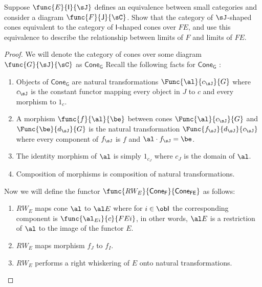 \documentclass[main.tex]{subfiles}
\begin{document}
\begin{exercise}
	Suppose $\func{E}{\mathsf{I}}{\sJ}$ defines an equivalence between
	small categories and consider a diagram $\func{F}{\mathsf{J}}{\sC}$.
	Show that the category of $\sJ$-shaped cones equivalent to the category
	of $\mathsf{I}$-shaped cones over $FE$, and use this equivalence to
	describe the relationship between limits of $F$ and limits of $FE$.
\end{exercise}

\begin{proof}
	We will denote the category of cones over some diagram $\func{G}{\sJ}{\sC}$
	as $\mathsf{Cone_{G}}$  Recall the following facts for $\mathsf{Cone_{G}}$ :
	\begin{enumerate}
		\item Objects of $\mathsf{Cone_{G}}$ are natural transformations
			$\Func{\al}{c_{\sJ} }{G}$ where $c_{\sJ}$ is the constant functor
			mapping every object in $J$ to $c$ and every morphism to $1_{c}$.

		\item A morphism $\func{f}{\al}{\be}$ between cones $\Func{\al}{c_{\sJ}
			}{G}$ and $\Func{\be}{d_{\sJ} }{G}$ is the natural transformation
			$\Func{ f_{\sJ} }{d_{\sJ}}{c_{\sJ}}$ where every component of $f_{\sJ}$ is
			$f$ and $\al \cdot f_{\sJ} = \be$.

		\item The identity morphism of $\al$ is simply $1_{c_J}$ where $c_{J}$ is
			the domain of $\al$.
		\item Composition of morphisms is composition of natural transformations.
	\end{enumerate}

	Now we will define the functor
	$\func{RW_{E}}{\mathsf{Cone_{F}}}{\mathsf{Cone_{FE}}}$ as follows:
	\begin{enumerate}
		\item $RW_{E}$ maps cone $\al$ to $\al E$ where for $i \in
			\ob\mathsf{I} $ the corresponding component is
			$\func{\al_{Ei}}{c}{FEi}$, in other words, $\al E$ is a restriction
			of $\al$ to the image of the functor $E$.
		\item $RW_{E}$ maps morphism $f_{J}$ to $f_{I}$.

		\item $RW_{E}$ performs a right whiskering of $E$ onto natural
			transformations.
	\end{enumerate}


\end{proof}
\end{document}
